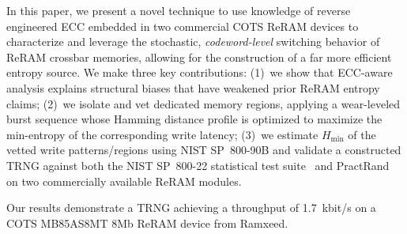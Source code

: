 In this paper, we present a novel technique to use knowledge of reverse engineered ECC embedded in two commercial COTS ReRAM devices to characterize and leverage the stochastic, \emph{codeword-level} switching behavior of ReRAM crossbar memories, allowing for the construction of a far more efficient entropy source. We make three key contributions: (1)~we show that ECC-aware analysis explains structural biases that have weakened prior ReRAM entropy claims; (2)~we isolate and vet dedicated memory regions, applying a wear-leveled burst sequence whose Hamming distance profile is optimized to maximize the min-entropy of the corresponding write latency; (3)~we estimate $H_{\min}$ of the vetted write patterns/regions using NIST SP~800-90B and validate a constructed TRNG against both the NIST SP~800-22 statistical test suite~\cite{rukhin2001statistical} and PractRand~\cite{practrand} on two commercially available ReRAM modules. 

Our results demonstrate a TRNG achieving a throughput of 1.7~kbit/s on a COTS MB85AS8MT 8Mb ReRAM device from Ramxeed.